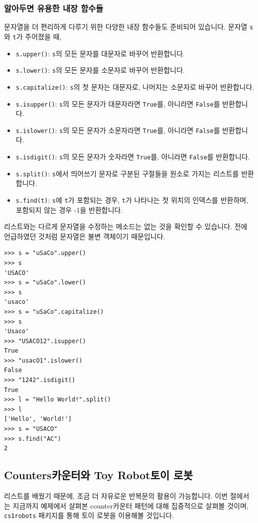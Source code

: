 \documentclass[../main.tex]{subfiles}
\begin{document}
\subsubsection{알아두면 유용한 내장 함수들}
문자열을 더 편리하게 다루기 위한 다양한 내장 함수들도 준비되어 있습니다.
문자열 \texttt{s}와 \texttt{t}가 주어졌을 때,
\begin{itemize}
\item \texttt{s.upper()}: \texttt{s}의 모든 문자를 대문자로 바꾸어 반환합니다.
\item \texttt{s.lower()}: \texttt{s}의 모든 문자를 소문자로 바꾸어 반환합니다.
\item \texttt{s.capitalize()}: \texttt{s}의 첫 문자는 대문자로, 나머지는 소문자로 바꾸어 반환합니다.
\item \texttt{s.isupper()}: \texttt{s}의 모든 문자가 대문자라면 \texttt{True}를, 아니라면 \texttt{False}를 반환합니다.
\item \texttt{s.islower()}: \texttt{s}의 모든 문자가 소문자라면 \texttt{True}를, 아니라면 \texttt{False}를 반환합니다.
\item \texttt{s.isdigit()}: \texttt{s}의 모든 문자가 숫자라면 \texttt{True}를, 아니라면 \texttt{False}를 반환합니다.
\item \texttt{s.split()}: \texttt{s}에서 띄어쓰기 문자로 구분된 구절들을 원소로 가지는 리스트를 반환합니다.
\item \texttt{s.find(t)}: \texttt{s}에 \texttt{t}가 포함되는 경우, \texttt{t}가 나타나는 첫 위치의 인덱스를 반환하며, 포함되지 않는 경우 -1을 반환합니다.
\end{itemize}
리스트와는 다르게 문자열을 수정하는 메소드는 없는 것을 확인할 수 있습니다.
전에 언급하였던 것처럼 문자열은 불변 객체이기 때문입니다.
\begin{verbatim}
>>> s = "uSaCo".upper()
>>> s
'USACO'
>>> s = "uSaCo".lower()
>>> s
'usaco'
>>> s = "uSaCo".capitalize()
>>> s
'Usaco'
>>> "USACO12".isupper()
True
>>> "usacO1".islower()
False
>>> "1242".isdigit()
True
>>> l = "Hello World!".split()
>>> l
['Hello', 'World!']
>>> s = "USACO"
>>> s.find("AC")
2
\end{verbatim}

\subsection{Counters카운터와 Toy Robot토이 로봇}
리스트를 배웠기 때문에, 조금 더 자유로운 반복문의 활용이 가능합니다.
이번 절에서는 지금까지 예제에서 살펴본 counter카운터 패턴에 대해 집중적으로 살펴볼 것이며, \texttt{cs1robots} 패키지를 통해 토이 로봇을 이용해볼 것입니다.
\end{document}
